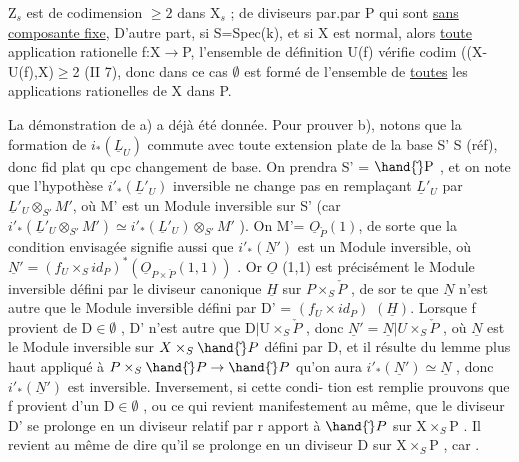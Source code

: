 
Z$_s$ est de codimension $\geq 2$ dans X$_s$ ; 
  de diviseurs par.par P qui sont
\uline{sans composante fixe},  D'autre part, si
S=Spec(k), et si X est normal, alors  \uline{toute} application rationelle
f:X$\to$P, l'ensemble de définition U(f) vérifie codim ((X-U(f),X)$\geq$2
(II 7), donc dans ce cas $\emptyset$ est formé de l'ensemble de \uline{toutes} les
applications rationelles de X dans P.

La démonstration de a) a déjà été donnée. Pour prouver b), notons
que la formation de $i_*(\underline{L}_U)$ commute avec toute extension plate de la
 
base S' \quad S (réf), donc  fid plat qu cpc
 changement de base. On
prendra S' = $\hand{\check{}}\mathrm{P}$ , et on note que l'hypothèse $i'_*(\underline{L}'_U)$ inversible ne
change pas en remplaçant $\underline{L}'_U$ par $\underline{L}'_U\otimes_{S'}M'$, où M' est un Module inversible
sur S' (car $i'_*(\underline{L}'_U\otimes_{S'}M')\simeq i'_*(\underline{L}'_U)\otimes_{S'}M'$ ). On  M'= $\underline{O}_{\check{P}}(1)$, de
sorte que la condition envisagée signifie aussi que $i'_*(\underline{N}')$ est un Module
inversible, où $\underline{N}'= (f_U\times_S id_P)^*(\underline{O}_{P\times\check{P}}(1,1))$ . Or $\underline{O}$ (1,1) est précisément
le Module inversible défini par le diviseur canonique $\underline{H}$ sur $P\times_S\check{P}$ , de sor%
te que $\underline{N}$ n'est autre que le Module inversible défini par \qquad D' =
$(f_U\times id_P)$ $(\underline{H})$.  Lorsque f provient de D$\in\emptyset$ , 
D' n'est autre que D$|$U$\times_S\check{P}$ ,  donc $\underline{N}' = \underline{N}|U\times_S\check{P}$ ,
où $\underline{N}$ est le Module inversible sur $X\times_S\hand{\check{}}P$ défini par D, et il résulte
du lemme  plus haut  appliqué à $P\times_S\hand{\check{}}P\to\hand{\check{}}P$ qu'on aura
$i'_*(\underline{N}')\simeq\underline{N}$ , donc $i'_*(\underline{N}')$ est inversible. Inversement, si cette condi-%
tion est remplie prouvons que f provient d'un D$\in\emptyset$ , ou ce qui revient
manifestement au même, que le diviseur D' se prolonge en un diviseur 
 relatif par r apport  à $\hand{\check{}}P$ sur X$\times_S$P . Il  revient au même
de dire qu'il se prolonge en un diviseur  D sur X$\times_S$P , car .

